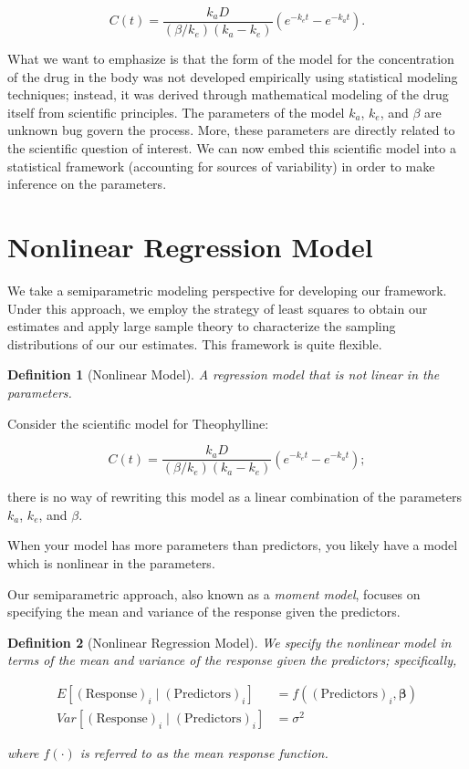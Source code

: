 \documentclass[
]{book}
\theoremstyle{plain}
\theoremstyle{mydefn}
\newtheorem{definition}{Definition}[chapter]
\theoremstyle{myexmpl}
\theoremstyle{remark}
\begin{document}
\[C(t) = \frac{k_a D}{\left(\beta/k_e\right)\left(k_a - k_e\right)} \left(e^{-k_e t} - e^{-k_a t}\right).\]

What we want to emphasize is that the form of the model for the concentration of the drug in the body was not developed empirically using statistical modeling techniques; instead, it was derived through mathematical modeling of the drug itself from scientific principles. The parameters of the model \(k_a\), \(k_e\), and \(\beta\) are unknown bug govern the process. More, these parameters are directly related to the scientific question of interest. We can now embed this scientific model into a statistical framework (accounting for sources of variability) in order to make inference on the parameters.

\hypertarget{nonlinear-regression-model}{%
\section{Nonlinear Regression Model}\label{nonlinear-regression-model}}

We take a semiparametric modeling perspective for developing our framework. Under this approach, we employ the strategy of least squares to obtain our estimates and apply large sample theory to characterize the sampling distributions of our our estimates. This framework is quite flexible.

\begin{definition}[Nonlinear Model]
A regression model that is \emph{not} linear in the parameters.
\end{definition}

Consider the scientific model for Theophylline:

\[C(t) = \frac{k_a D}{\left(\beta/k_e\right)\left(k_a - k_e\right)} \left(e^{-k_e t} - e^{-k_a t}\right);\]

there is no way of rewriting this model as a linear combination of the parameters \(k_a\), \(k_e\), and \(\beta\).

\begin{rmdtip}
When your model has more parameters than predictors, you likely have a model which is nonlinear in the parameters.
\end{rmdtip}

Our semiparametric approach, also known as a \emph{moment model}, focuses on specifying the mean and variance of the response given the predictors.

\begin{definition}[Nonlinear Regression Model]
We specify the nonlinear model in terms of the \emph{mean} and \emph{variance} of the response given the predictors; specifically,

\[
\begin{aligned}
  E\left[(\text{Response})_i \mid (\text{Predictors})_i\right] 
    &= f\left((\text{Predictors})_i, \boldsymbol{\beta}\right) \\
  Var\left[(\text{Response})_i \mid (\text{Predictors})_i\right]
    &= \sigma^2
\end{aligned}
\]

where \(f(\cdot)\) is referred to as the mean response function.
\end{definition}
\end{document}
